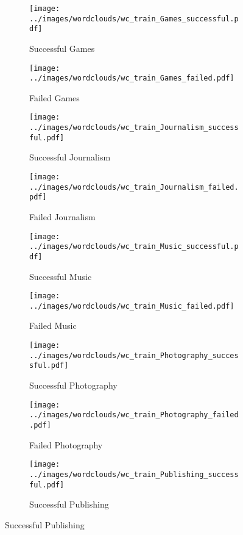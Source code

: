 \documentclass{article}
\begin{document}
\begin{itemize}
\begin{figure}
\begin{subfigure}[i]{0.2\linewidth}
    \centering\texttt{[image: ../images/wordclouds/wc\_train\_Games\_successful.pdf]}
    \caption{Successful Games}
    \label{fig:Games_s}
  \end{subfigure} 
  \begin{subfigure}[i']{0.2\linewidth}
    \centering\texttt{[image: ../images/wordclouds/wc\_train\_Games\_failed.pdf]}
    \caption{Failed Games}
    \label{fig:Games_f}
  \end{subfigure}
  \begin{subfigure}[j]{0.2\linewidth}
    \centering\texttt{[image: ../images/wordclouds/wc\_train\_Journalism\_successful.pdf]}
    \caption{Successful Journalism}
    \label{fig:Journalism_s}
  \end{subfigure} 
  \begin{subfigure}[j']{0.2\linewidth}
    \centering\texttt{[image: ../images/wordclouds/wc\_train\_Journalism\_failed.pdf]}
    \caption{Failed Journalism}
    \label{fig:Journalism_f}
  \end{subfigure}
  \begin{subfigure}[k]{0.2\linewidth}
    \centering\texttt{[image: ../images/wordclouds/wc\_train\_Music\_successful.pdf]}
    \caption{Successful Music}
    \label{fig:Music_s}
  \end{subfigure} 
  \begin{subfigure}[k']{0.2\linewidth}
    \centering\texttt{[image: ../images/wordclouds/wc\_train\_Music\_failed.pdf]}
    \caption{Failed Music}
    \label{fig:Music_f}
  \end{subfigure}
  \begin{subfigure}[l]{0.2\linewidth}
    \centering\texttt{[image: ../images/wordclouds/wc\_train\_Photography\_successful.pdf]}
    \caption{Successful Photography}
    \label{fig:Photography_s}
  \end{subfigure} 
  \begin{subfigure}[l']{0.2\linewidth}
    \centering\texttt{[image: ../images/wordclouds/wc\_train\_Photography\_failed.pdf]}
    \caption{Failed Photography}
    \label{fig:Photography_f}
  \end{subfigure}
    \begin{subfigure}[m]{0.2\linewidth}
    \centering\texttt{[image: ../images/wordclouds/wc\_train\_Publishing\_successful.pdf]}
    \caption{Successful Publishing}
    \label{fig:Publishing_s}
  \end{subfigure} 

\end{figure}
\end{itemize}
\end{document}
